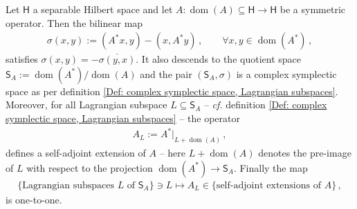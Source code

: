 \begin{theorem}\label{Thm: self-adjoint extensions with Lagrangian subspaces}
	Let $\mathsf{H}$ a separable Hilbert space and let $A\colon\operatorname{dom}(A)\subseteq\mathsf{H}\to\mathsf{H}$ be a symmetric operator.
	Then the bilinear map
	\begin{align}\label{Eqn: symplectic form}
		\sigma(x,y):=(A^*x,y)-(x,A^*y)\,,\qquad\forall x,y\in\operatorname{dom}(A^*)\,,
	\end{align}
	satisfies $\sigma(x,y)=-\overline{\sigma(y,x)}$.
	It also descends to the quotient space $\mathsf{S}_A:=\operatorname{dom}(A^*)/\operatorname{dom}(A)$ and the pair $(\mathsf{S}_A,\sigma)$ is a complex symplectic space as per definition \ref{Def: complex symplectic space, Lagrangian subspaces}.
	Moreover, for all Lagrangian subspace $L\subseteq\mathsf{S}_A$  -- \textit{cf.} definition \ref{Def: complex symplectic space, Lagrangian subspaces} -- the operator
	\begin{align}\label{Eqn: Lagrangian self-adjoint extension}
		A_L:=A^*|_{L+\operatorname{dom}(A)}\,,
	\end{align}
	defines a self-adjoint extension of $A$ -- here $L+\operatorname{dom}(A)$ denotes the pre-image of $L$ with respect to the projection $\operatorname{dom}(A^*)\to\mathsf{S}_A$.
	Finally the map
	\begin{align}
		\lbrace\textrm{Lagrangian subspaces $L$ of $\mathsf{S}_A$}\rbrace
		\ni L\mapsto A_L\in
		\lbrace\textrm{self-adjoint extensions of }A\rbrace\,,
	\end{align}
	is one-to-one.
\end{theorem}
